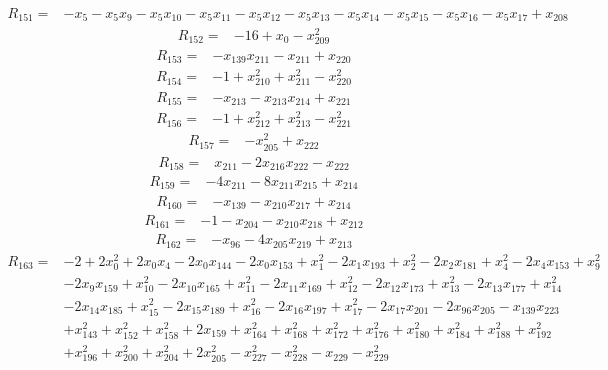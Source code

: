 \begin{align*}
 R_{151}={}&-x_{5} -x_{5}x_{9} -x_{5}x_{10} -x_{5}x_{11} -x_{5}x_{12} -x_{5}x_{13} -x_{5}x_{14} -x_{5}x_{15} -x_{5}x_{16} -x_{5}x_{17} +x_{208}
\end{align*}
\begin{align*}
 R_{152}={}&-16 +x_{0} -x_{209}^{2}
\end{align*}
\begin{align*}
 R_{153}={}&-x_{139}x_{211} -x_{211} +x_{220}
\end{align*}
\begin{align*}
 R_{154}={}&-1 +x_{210}^{2} +x_{211}^{2} -x_{220}^{2}
\end{align*}
\begin{align*}
 R_{155}={}&-x_{213} -x_{213}x_{214} +x_{221}
\end{align*}
\begin{align*}
 R_{156}={}&-1 +x_{212}^{2} +x_{213}^{2} -x_{221}^{2}
\end{align*}
\begin{align*}
 R_{157}={}&-x_{205}^{2} +x_{222}
\end{align*}
\begin{align*}
 R_{158}={}&x_{211} -2x_{216}x_{222} -x_{222}
\end{align*}
\begin{align*}
 R_{159}={}&-4x_{211} -8x_{211}x_{215} +x_{214}
\end{align*}
\begin{align*}
 R_{160}={}&-x_{139} -x_{210}x_{217} +x_{214}
\end{align*}
\begin{align*}
 R_{161}={}&-1 -x_{204} -x_{210}x_{218} +x_{212}
\end{align*}
\begin{align*}
 R_{162}={}&-x_{96} -4x_{205}x_{219} +x_{213}
\end{align*}
\begin{align*}
 R_{163}={}&-2 +2x_{0}^{2} +2x_{0}x_{4} -2x_{0}x_{144} -2x_{0}x_{153} +x_{1}^{2} -2x_{1}x_{193} +x_{2}^{2} -2x_{2}x_{181} +x_{4}^{2} -2x_{4}x_{153} +x_{9}^{2}\\
 &-2x_{9}x_{159} +x_{10}^{2} -2x_{10}x_{165} +x_{11}^{2} -2x_{11}x_{169} +x_{12}^{2} -2x_{12}x_{173} +x_{13}^{2} -2x_{13}x_{177} +x_{14}^{2}\\
 &-2x_{14}x_{185} +x_{15}^{2} -2x_{15}x_{189} +x_{16}^{2} -2x_{16}x_{197} +x_{17}^{2} -2x_{17}x_{201} -2x_{96}x_{205} -x_{139}x_{223}\\
 &+x_{143}^{2} +x_{152}^{2} +x_{158}^{2} +2x_{159} +x_{164}^{2} +x_{168}^{2} +x_{172}^{2} +x_{176}^{2} +x_{180}^{2} +x_{184}^{2} +x_{188}^{2} +x_{192}^{2}\\
 &+x_{196}^{2} +x_{200}^{2} +x_{204}^{2} +2x_{205}^{2} -x_{227}^{2} -x_{228}^{2} -x_{229} -x_{229}^{2}
\end{align*}

